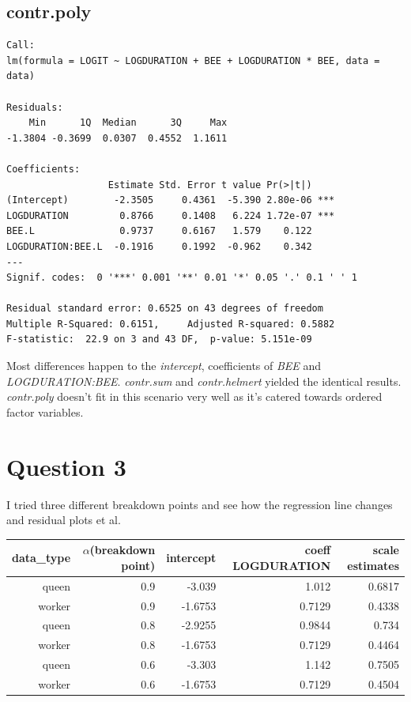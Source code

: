 \documentclass[a4paper,10pt]{article}
\begin{document}
\subsection{contr.poly}
\begin{verbatim}
Call:
lm(formula = LOGIT ~ LOGDURATION + BEE + LOGDURATION * BEE, data = data)

Residuals:
    Min      1Q  Median      3Q     Max
-1.3804 -0.3699  0.0307  0.4552  1.1611

Coefficients:
                  Estimate Std. Error t value Pr(>|t|)
(Intercept)        -2.3505     0.4361  -5.390 2.80e-06 ***
LOGDURATION         0.8766     0.1408   6.224 1.72e-07 ***
BEE.L               0.9737     0.6167   1.579    0.122
LOGDURATION:BEE.L  -0.1916     0.1992  -0.962    0.342
---
Signif. codes:  0 '***' 0.001 '**' 0.01 '*' 0.05 '.' 0.1 ' ' 1

Residual standard error: 0.6525 on 43 degrees of freedom
Multiple R-Squared: 0.6151,     Adjusted R-squared: 0.5882
F-statistic:  22.9 on 3 and 43 DF,  p-value: 5.151e-09
\end{verbatim}

Most differences happen to the \emph{intercept}, coefficients of \emph{BEE} and \emph{LOGDURATION:BEE}. \emph{contr.sum} and \emph{contr.helmert} yielded the identical results. \emph{contr.poly} doesn't fit in this scenario very well as it's catered towards ordered factor variables.

\section{Question 3}
I tried three different breakdown points and see how the regression line changes and residual plots et al.
\newline
\begin{tabular}{|r|r|r|r|r|}
\hline
data\_type & $\alpha$(breakdown point) & intercept & coeff LOGDURATION & scale estimates\\
\hline
queen & 0.9 & -3.039 & 1.012 & 0.6817 \\
\hline
worker & 0.9 & -1.6753 & 0.7129 & 0.4338 \\
\hline
queen & 0.8 & -2.9255 & 0.9844 & 0.734 \\
\hline
worker & 0.8 & -1.6753 & 0.7129 & 0.4464 \\
\hline
queen & 0.6 & -3.303 & 1.142 & 0.7505 \\
\hline
worker & 0.6 & -1.6753 & 0.7129 & 0.4504 \\
\hline
\end{tabular}
\end{document}
